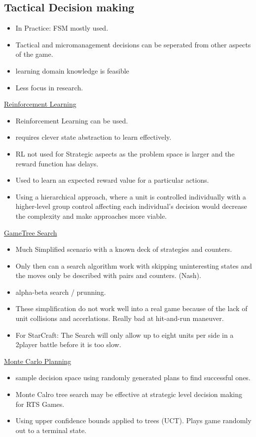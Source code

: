 \subsection{Tactical Decision making}
\begin{itemize}[noitemsep,nolistsep]
	\item In Practice: FSM mostly used.
	\item Tactical and micromanagement decisions can be seperated from other aspects of the game.
	\item learning domain knowledge is feasible
	\item Less focus in research.
\end{itemize}
\underline{Reinforcement Learning}
\begin{itemize}[noitemsep,nolistsep]
	\item Reinforcement Learning can be used. 
	\item requires clever state abstraction to learn effectively.
	\item RL not used for Strategic aspects as the problem space is larger and the reward function has delays.
	\item Used to learn an expected reward value for a particular actions.
	\item Using a hierarchical approach, where a unit is controlled individually with a higher-level group control affecting each individual's decision would decrease the complexity and make approaches more viable.
\end{itemize}
\underline{GameTree Search}
\begin{itemize}[noitemsep,nolistsep]
	\item Much Simplified scenario with a known deck of strategies and counters.
	\item Only then can a search algorithm work with skipping uninteresting states and the moves only be described with pairs and counters. (Nash).
	\item alpha-beta search / prunning.
	\item These simplification do not work well into a real game because of the lack of unit collisions and accerlations. Really bad at hit-and-run maneuver.
	\item For StarCraft: The Search will only allow up to eight units per side in a 2player battle before it is too slow.
\end{itemize}
\underline{Monte Carlo Planning}
\begin{itemize}[noitemsep,nolistsep]
	\item sample decision space using randomly generated plans to find successful ones.
	\item Monte Calro tree search may be effective at strategic level decision making for RTS Games.
	\item Using upper confidence bounds applied to trees (UCT). Plays game randomly out to a terminal state.
\end{itemize}

